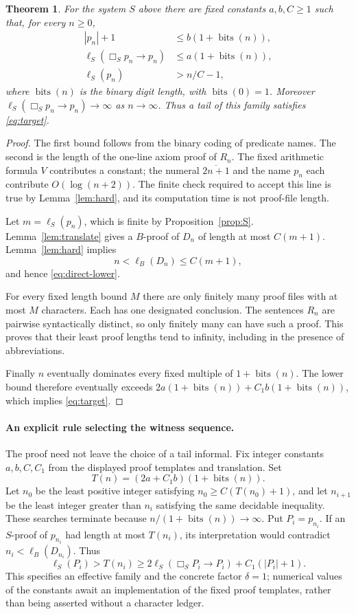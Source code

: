 \documentclass[11pt]{article}
\newtheorem{theorem}{Theorem}
\theoremstyle{remark}
\newcommand{\num}[1]{\overline{#1}}
\newcommand{\bits}{\operatorname{bits}}
\begin{document}
\begin{theorem}\label{thm:main}
For the system $S$ above there are fixed constants $a,b,C\ge1$ such that,
for every $n\ge0$,
\begin{align}
 |p_n|+1&\le b(1+\bits(n)),\label{eq:pn-size}\\
 \ell_S(\Box_Sp_n\to p_n)&\le a(1+\bits(n)),\label{eq:reflection-upper}\\
 \ell_S(p_n)&>n/C-1,\label{eq:direct-lower}
\end{align}
where $\bits(n)$ is the binary digit length, with $\bits(0)=1$.
Moreover $\ell_S(\Box_Sp_n\to p_n)\to\infty$ as $n\to\infty$.
Thus a tail of this family satisfies \eqref{eq:target}.
\end{theorem}
\begin{proof}
The first bound follows from the binary coding of predicate names.
The second is the length of the one-line axiom proof of $R_n$.
The fixed arithmetic formula $V$ contributes a constant; the numeral
$\num{2n+1}$ and the name $p_n$ each contribute $O(\log(n+2))$.
The finite check required to accept this line is true by
Lemma~\ref{lem:hard}, and its computation time is not proof-file length.

Let $m=\ell_S(p_n)$, which is finite by Proposition~\ref{prop:S}.
Lemma~\ref{lem:translate} gives a $B$-proof of $D_n$ of length at most
$C(m+1)$. Lemma~\ref{lem:hard} implies
\[
 n<\ell_B(D_n)\le C(m+1),
\]
and hence \eqref{eq:direct-lower}.

For every fixed length bound $M$ there are only finitely many proof files
with at most $M$ characters. Each has one designated conclusion. The
sentences $R_n$ are pairwise syntactically distinct, so only finitely many
can have such a proof. This proves that their least proof lengths tend
to infinity, including in the presence of abbreviations.

Finally $n$ eventually dominates every fixed multiple of
$1+\bits(n)$. The lower bound therefore eventually exceeds
$2a(1+\bits(n))+C_1b(1+\bits(n))$, which implies
\eqref{eq:target}.
\end{proof}

\paragraph{An explicit rule selecting the witness sequence.}
The proof need not leave the choice of a tail informal. Fix integer constants
$a,b,C,C_1$ from the displayed proof templates and translation. Set
\[
 T(n)=(2a+C_1b)(1+\bits(n)).
\]
Let $n_0$ be the least positive integer satisfying
$n_0\ge C(T(n_0)+1)$, and let $n_{i+1}$ be the least integer greater
than $n_i$ satisfying the same decidable inequality. These searches terminate
because $n/(1+\bits(n))\to\infty$.
Put $P_i=p_{n_i}$. If an $S$-proof of $p_{n_i}$ had length at most $T(n_i)$,
its interpretation would contradict
$n_i<\ell_B(D_{n_i})$. Thus
\[
 \ell_S(P_i)>T(n_i)
 \ge 2\ell_S(\Box_SP_i\to P_i)+C_1(|P_i|+1).
\]
This specifies an effective family and the concrete factor $\delta=1$;
numerical values of the constants await an implementation of the fixed
proof templates, rather than being asserted without a character ledger.
\end{document}
